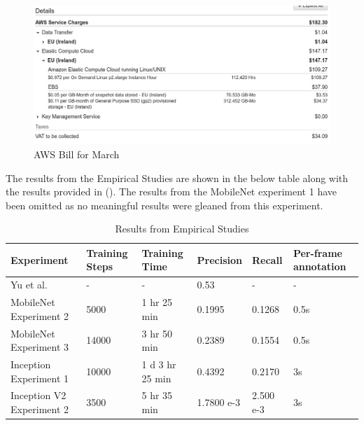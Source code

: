 \documentclass[12pt]{report}
\begin{document}
\vspace{0.5cm}
\begin{figure}[ht!]
	\centering
	\includegraphics[width=15cm]{bill}
	\caption{AWS Bill for March}
	\label{fig:bill}
\end{figure}

\begin{flushleft}
The results from the Empirical Studies are shown in the below table along with the results provided in (\cite{yu2018bdd100k}). The results from the MobileNet experiment 1 have been omitted as no meaningful results were gleaned from this experiment.
\end{flushleft}

\begin{table}[]
\begin{tabular}[ht]{|p{3cm}|p{2cm}|p{2cm}|p{2cm}|p{2cm}|p{2cm}|}
\hline
Experiment                & Training Steps & Training Time   & Precision  & Recall    & Per-frame annotation \\ \hline
Yu et al.                 & -              & -               & 0.53       & -         & -                    \\ \hline
MobileNet Experiment 2    & 5000           & 1 hr 25 min     & 0.1995     & 0.1268    & 0.5s                 \\ \hline
MobileNet Experiment 3    & 14000          & 3 hr 50 min     & 0.2389     & 0.1554    & 0.5s                 \\ \hline
Inception Experiment 1    & 10000          & 1 d 3 hr 25 min & 0.4392     & 0.2170    & 3s                   \\ \hline
Inception V2 Experiment 2 & 3500           & 5 hr 35 min     & 1.7800 e-3 & 2.500 e-3 & 3s                   \\ \hline
\end{tabular}
\caption{Results from Empirical Studies}
\end{table}
\end{document}
